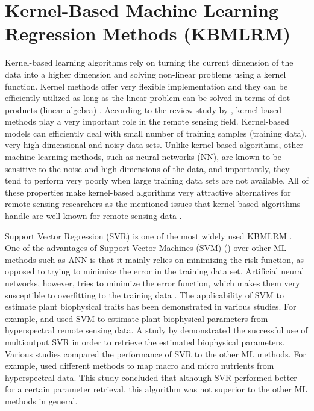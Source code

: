 \documentclass[a4paper, twoside]{templates/ociamthesis}
\begin{document}
\hypertarget{kernel}{%
\section{Kernel-Based Machine Learning Regression Methods (KBMLRM)}\label{kernel}}

Kernel-based learning algorithms rely on turning the current dimension of the data into a higher dimension and solving non-linear problems using a kernel function. Kernel methods offer very flexible implementation and they can be efficiently utilized as long as the linear problem can be solved in terms of dot products (linear algebra) \citep{verrelst2019quantifying}. According to the review study by \citet{gomez2011review}, kernel-based methods play a very important role in the remote sensing field. Kernel-based models can efficiently deal with small number of training samples (training data), very high-dimensional and noisy data sets. Unlike kernel-based algorithms, other machine learning methods, such as neural networks (NN), are known to be sensitive to the noise and high dimensions of the data, and importantly, they tend to perform very poorly when large training data sets are not available. All of these properties make kernel-based algorithms very attractive alternatives for remote sensing researchers as the mentioned issues that kernel-based algorithms handle are well-known for remote sensing data \citep{gomez2011review}.

Support Vector Regression (SVR) \citep{drucker1997support} is one of the most widely used KBMLRM \citep{verrelst2019quantifying}. One of the advantages of Support Vector Machines (SVM) (\citet{boser1992training}) over other ML methods such as ANN is that it mainly relies on minimizing the risk function, as opposed to trying to minimize the error in the training data set. Artificial neural networks, however, tries to minimize the error function, which makes them very susceptible to overfitting to the training data \citep{karimi2008application}. The applicability of SVM to estimate plant biophysical traits has been demonstrated in various studies. For example, \citet{karimi2008application} and \citet{yang2011estimating} used SVM to estimate plant biophysical parameters from hyperspectral remote sensing data. A study by \citet{tuia2011multioutput} demonstrated the successful use of multioutput SVR in order to retrieve the estimated biophysical parameters. Various studies compared the performance of SVR to the other ML methods. For example, \citet{pullanagari2016mapping} used different methods to map macro and micro nutrients from hyperspectral data. This study concluded that although SVR performed better for a certain parameter retrieval, this algorithm was not superior to the other ML methods in general.
\end{document}
